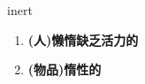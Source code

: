 
\begin{frame}
{\huge inert}
\begin{center}
\begin{enumerate}\Large
  \item \textbf{(人)懒惰缺乏活力的}
  \item \textbf{(物品)惰性的}
\end{enumerate}
\end{center}
\end{frame}
